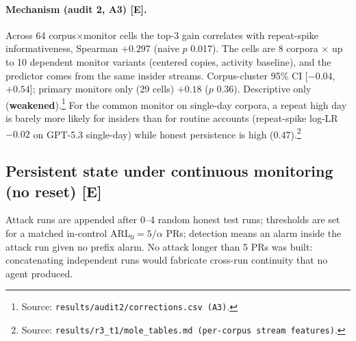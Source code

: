\documentclass[11pt]{article}
\newcommand{\m}{\ensuremath{-}}
\newcommand{\src}[1]{\footnote{Source: \nolinkurl{#1}.}}
\newcommand{\vweak}{\textcolor{BurntOrange}{\textbf{weakened}}}
\newcommand{\tE}{\textsf{\scriptsize\textcolor{ink2}{[E]}}\xspace}
\begin{document}
\paragraph{Mechanism (audit 2, A3) \tE.} Across 64 corpus$\times$monitor cells the top-3 gain correlates with repeat-spike informativeness, Spearman $+0.297$ (naive $p$ 0.017). The cells are 8 corpora $\times$ up to 10 dependent monitor variants (centered copies, activity baseline), and the predictor comes from the same insider streams. Corpus-cluster 95\% CI [$\m0.04$, $+0.54$]; primary monitors only (29 cells) $+0.18$ ($p$ 0.36). Descriptive only (\vweak).\src{results/audit2/corrections.csv (A3)} For the common monitor on single-day corpora, a repeat high day is barely more likely for insiders than for routine accounts (repeat-spike log-LR $\m0.02$ on GPT-5.3 single-day) while honest persistence is high (0.47).\src{results/r3_t1/mole_tables.md (per-corpus stream features)}


\subsection{Persistent state under continuous monitoring (no reset) \tE}\label{sec:longh}
Attack runs are appended after 0--4 random honest test runs; thresholds are set for a matched in-control ARL$_0=5/\alpha$ PRs; detection means an alarm inside the attack run given no prefix alarm. No attack longer than 5 PRs was built: concatenating independent runs would fabricate cross-run continuity that no agent produced.
\end{document}
